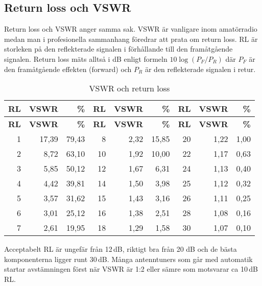 \subsection{Return loss och VSWR}

Return loss och VSWR anger samma sak. VSWR är vanligare inom amatörradio medan
man i profesionella sammanhang föredrar att prata om return loss. RL är
storleken på den reflekterade signalen i förhållande till den framåtgående
signalen. Return loss mäts alltså i dB enligt formeln $10\log(P_F/P_R)$ där
$P_F$ är den framåtgående effekten (forward) och $P_R$ är den reflekterade
signalen i retur.

\begin{longtable}{rrr|rrr|rrr}
	\caption{VSWR och return loss}\\
		\textbf{RL} & \textbf{VSWR} & \textbf{\%} & \textbf{RL} & \textbf{VSWR} & \textbf{\%} & \textbf{RL} & \textbf{VSWR} & \textbf{\%} \\ \hline
	\endfirsthead
	\textbf{RL} & \textbf{VSWR} & \textbf{\%} & \textbf{RL} & \textbf{VSWR} & \textbf{\%} & \textbf{RL} & \textbf{VSWR} & \textbf{\%} \\ \hline 	\endhead
	          1 &         17,39 &       79,43 &           8 &          2,32 &       15,85 &          20 &          1,22 &        1,00 \\
	          2 &          8,72 &       63,10 &          10 &          1,92 &       10,00 &          22 &          1,17 &        0,63 \\
	          3 &          5,85 &       50,12 &          12 &          1,67 &        6,31 &          24 &          1,13 &        0,40 \\
	          4 &          4,42 &       39,81 &          14 &          1,50 &        3,98 &          25 &          1,12 &        0,32 \\
	          5 &          3,57 &       31,62 &          15 &          1,43 &        3,16 &          26 &          1,11 &        0,25 \\
	          6 &          3,01 &       25,12 &          16 &          1,38 &        2,51 &          28 &          1,08 &        0,16 \\
	          7 &          2,61 &       19,95 &          18 &          1,29 &        1,58 &          30 &          1,07 &        0,10
\end{longtable}

Acceptabelt RL är ungefär från 12\,dB, riktigt bra från 20 dB och de bästa
komponenterna ligger runt 30\,dB. Många antenntuners som går med automatik
startar avstämningen först när VSWR är 1:2 eller sämre som motsvarar ca
10\,dB\,RL.

